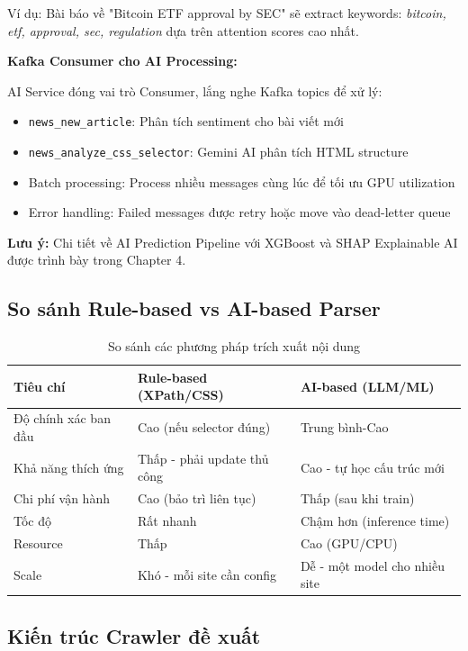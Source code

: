Ví dụ: Bài báo về "Bitcoin ETF approval by SEC" sẽ extract keywords: \textit{bitcoin, etf, approval, sec, regulation} dựa trên attention scores cao nhất.

\noindent\textbf{Kafka Consumer cho AI Processing:}

AI Service đóng vai trò Consumer, lắng nghe Kafka topics để xử lý:
\begin{itemize}
    \item \texttt{news\_new\_article}: Phân tích sentiment cho bài viết mới
    \item \texttt{news\_analyze\_css\_selector}: Gemini AI phân tích HTML structure
    \item Batch processing: Process nhiều messages cùng lúc để tối ưu GPU utilization
    \item Error handling: Failed messages được retry hoặc move vào dead-letter queue
\end{itemize}

\textbf{Lưu ý:} Chi tiết về AI Prediction Pipeline với XGBoost và SHAP Explainable AI được trình bày trong Chapter 4.

\subsection{So sánh Rule-based vs AI-based Parser}

\begin{table}[H]
\centering
\caption{So sánh các phương pháp trích xuất nội dung}
\begin{tabular}{|p{3cm}|p{5cm}|p{5cm}|}
\hline
\textbf{Tiêu chí} & \textbf{Rule-based (XPath/CSS)} & \textbf{AI-based (LLM/ML)} \\
\hline
Độ chính xác ban đầu & Cao (nếu selector đúng) & Trung bình-Cao \\
\hline
Khả năng thích ứng & Thấp - phải update thủ công & Cao - tự học cấu trúc mới \\
\hline
Chi phí vận hành & Cao (bảo trì liên tục) & Thấp (sau khi train) \\
\hline
Tốc độ & Rất nhanh & Chậm hơn (inference time) \\
\hline
Resource & Thấp & Cao (GPU/CPU) \\
\hline
Scale & Khó - mỗi site cần config & Dễ - một model cho nhiều site \\
\hline
\end{tabular}
\end{table}

\subsection{Kiến trúc Crawler đề xuất}


